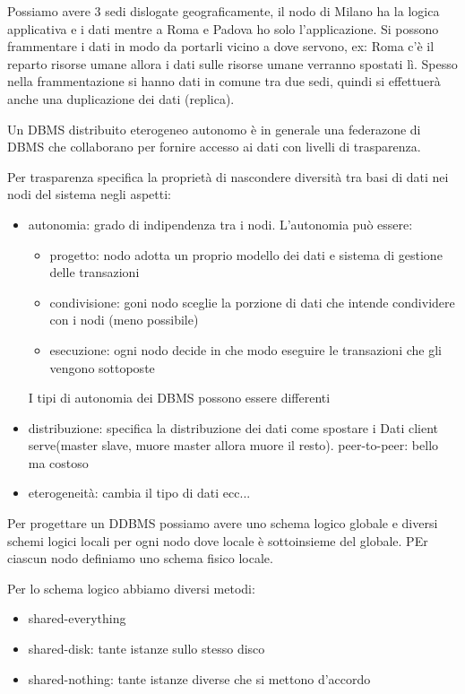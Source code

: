 Possiamo avere 3 sedi dislogate geograficamente, il nodo di Milano ha la logica applicativa
e i dati mentre a Roma e Padova ho solo l'applicazione. Si possono frammentare i 
dati in modo da portarli vicino a dove servono, ex: Roma c'è il reparto risorse 
umane allora i dati sulle risorse umane verranno spostati lì. Spesso nella frammentazione
si hanno dati in comune tra due sedi, quindi si effettuerà anche una duplicazione 
dei dati (replica).
\begin{definizione}
    Un DBMS distribuito eterogeneo autonomo è in generale una federazone di DBMS 
    che collaborano per fornire accesso ai dati con livelli di trasparenza.
\end{definizione} 
Per trasparenza specifica la proprietà di nascondere diversità tra basi di dati nei nodi
del sistema negli aspetti:
\begin{itemize}
    \item autonomia: grado di indipendenza tra i nodi. L'autonomia può essere:
    \begin{itemize}
        \item progetto: nodo adotta un proprio modello dei dati e sistema di gestione delle transazioni
        \item condivisione: goni  nodo sceglie la porzione di dati che intende condividere con i nodi (meno possibile)
        \item esecuzione: ogni nodo decide in che modo eseguire le transazioni che gli vengono sottoposte  
    \end{itemize}
    I tipi di autonomia dei DBMS possono essere differenti 
    \item distribuzione: specifica la distribuzione dei dati come spostare i Dati
    client serve(master slave, muore master allora muore il resto). peer-to-peer: bello ma costoso
    \item eterogeneità: cambia il tipo di dati ecc...
\end{itemize}
Per progettare un DDBMS possiamo avere uno schema logico globale e diversi schemi 
logici locali per ogni nodo dove locale è sottoinsieme del globale. PEr ciascun
nodo definiamo uno schema fisico locale. 

Per lo schema logico abbiamo diversi metodi:
\begin{itemize}
    \item shared-everything
    \item shared-disk: tante istanze sullo stesso disco
    \item shared-nothing: tante istanze diverse che si mettono d'accordo
\end{itemize}

